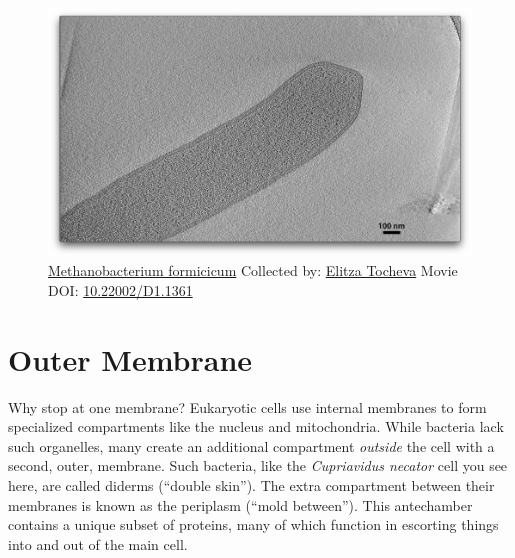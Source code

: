 \documentclass[]{tufte-book}
\begin{document}
\begin{figure}
\includegraphics{movie_stills/2_2b} \caption[\protect\hyperlink{tree}{Methanobacterium formicicum}
Collected by: \protect\hyperlink{elitza_tocheva}{Elitza Tocheva} Movie
DOI: \href{https://doi.org/10.22002/D1.1361}{10.22002/D1.1361}]{\protect\hyperlink{tree}{Methanobacterium formicicum}
Collected by: \protect\hyperlink{elitza_tocheva}{Elitza Tocheva} Movie
DOI: \href{https://doi.org/10.22002/D1.1361}{10.22002/D1.1361}}\label{fig:2-2b}
\end{figure}

\section{Outer Membrane}\label{outer-membrane}

Why stop at one membrane? Eukaryotic cells use internal membranes to
form specialized compartments like the nucleus and mitochondria. While
bacteria lack such organelles, many create an additional compartment
\emph{outside} the cell with a second, outer, membrane. Such bacteria,
like the \emph{Cupriavidus necator} cell you see here, are called
diderms (``double skin''). The extra compartment between their membranes
is known as the periplasm (``mold between''). This antechamber contains
a unique subset of proteins, many of which function in escorting things
into and out of the main cell.
\end{document}
